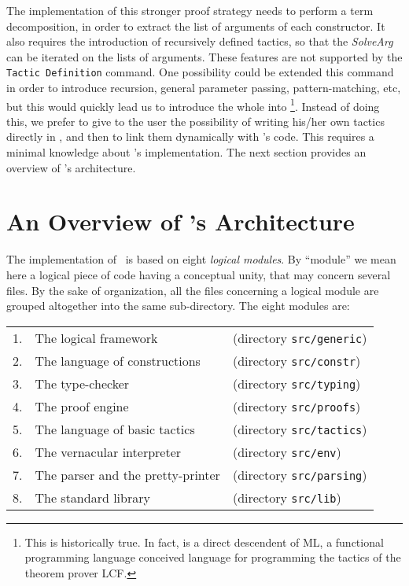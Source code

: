 The implementation of this stronger proof strategy needs to perform a
term decomposition, in order to extract the list of arguments of each
constructor. It also requires the introduction of recursively defined
tactics, so that the \textsl{SolveArg} can be iterated on the lists of
arguments. These features are not supported by the \texttt{Tactic
Definition} command. One possibility could be extended this command in
order to introduce recursion, general parameter passing,
pattern-matching, etc, but this would quickly lead us to introduce the
whole \ocaml{} into \Coq\footnote{This is historically true. In fact,
\ocaml{} is a direct descendent of ML, a functional programming language
conceived language for programming the tactics of the theorem prover
LCF.}.  Instead of doing this, we prefer to give to the user the
possibility of writing his/her own tactics directly in \ocaml{}, and then
to link them dynamically with \Coq's code. This requires a minimal
knowledge about \Coq's implementation. The next section provides an
overview of \Coq's architecture.


\section{An Overview of \Coq's Architecture}

The implementation of \Coq\ is based on eight \textsl{logical
modules}. By ``module'' we mean here a logical piece of code having a
conceptual unity, that may concern several \ocaml{} files. By the sake of
organization, all the \ocaml{} files concerning a logical module are
grouped altogether into the same sub-directory. The eight modules
are:

\begin{tabular}{lll}
1. & The logical framework           & (directory \texttt{src/generic})\\
2. &  The language of constructions  & (directory \texttt{src/constr})\\
3. &  The type-checker               & (directory \texttt{src/typing})\\
4. &  The proof engine               & (directory \texttt{src/proofs})\\
5. &  The language of basic tactics  & (directory \texttt{src/tactics})\\
6. &  The vernacular interpreter     & (directory \texttt{src/env})\\
7. &  The parser and the pretty-printer  & (directory \texttt{src/parsing})\\
8. &  The standard library           & (directory \texttt{src/lib})
\end{tabular}


